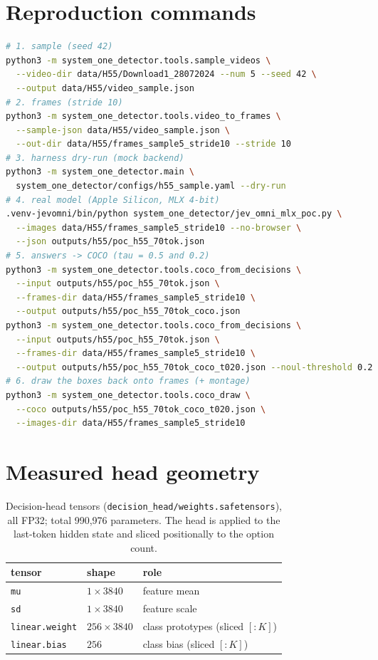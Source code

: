 \documentclass[11pt]{article}
\newcommand{\code}[1]{\texttt{#1}}
\begin{document}
\section{Reproduction commands}

\begin{lstlisting}[language=bash]
# 1. sample (seed 42)
python3 -m system_one_detector.tools.sample_videos \
  --video-dir data/H55/Download1_28072024 --num 5 --seed 42 \
  --output data/H55/video_sample.json
# 2. frames (stride 10)
python3 -m system_one_detector.tools.video_to_frames \
  --sample-json data/H55/video_sample.json \
  --out-dir data/H55/frames_sample5_stride10 --stride 10
# 3. harness dry-run (mock backend)
python3 -m system_one_detector.main \
  system_one_detector/configs/h55_sample.yaml --dry-run
# 4. real model (Apple Silicon, MLX 4-bit)
.venv-jevomni/bin/python system_one_detector/jev_omni_mlx_poc.py \
  --images data/H55/frames_sample5_stride10 --no-browser \
  --json outputs/h55/poc_h55_70tok.json
# 5. answers -> COCO (tau = 0.5 and 0.2)
python3 -m system_one_detector.tools.coco_from_decisions \
  --input outputs/h55/poc_h55_70tok.json \
  --frames-dir data/H55/frames_sample5_stride10 \
  --output outputs/h55/poc_h55_70tok_coco.json
python3 -m system_one_detector.tools.coco_from_decisions \
  --input outputs/h55/poc_h55_70tok.json \
  --frames-dir data/H55/frames_sample5_stride10 \
  --output outputs/h55/poc_h55_70tok_coco_t020.json --noul-threshold 0.2
# 6. draw the boxes back onto frames (+ montage)
python3 -m system_one_detector.tools.coco_draw \
  --coco outputs/h55/poc_h55_70tok_coco_t020.json \
  --images-dir data/H55/frames_sample5_stride10
\end{lstlisting}

\section{Measured head geometry}

\begin{table}[h]
\centering
\caption{Decision-head tensors (\code{decision\_head/weights.safetensors}),
all FP32; total 990{,}976 parameters. The head is applied to the last-token
hidden state and sliced positionally to the option count.}
\begin{tabular}{lll}
\toprule
tensor & shape & role \\
\midrule
\code{mu} & $1\times3840$ & feature mean \\
\code{sd} & $1\times3840$ & feature scale \\
\code{linear.weight} & $256\times3840$ & class prototypes (sliced $[:K]$) \\
\code{linear.bias} & $256$ & class bias (sliced $[:K]$) \\
\bottomrule
\end{tabular}
\end{table}
\end{document}
